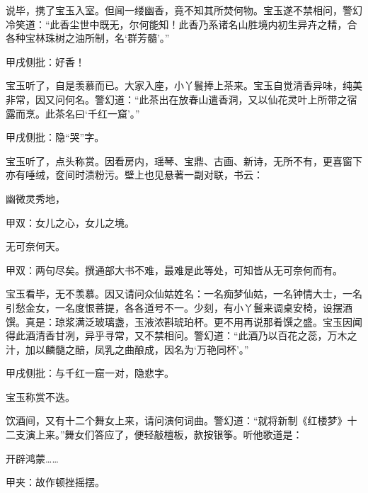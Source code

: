 \begin{parag}
    说毕，携了宝玉入室。但闻一缕幽香，竟不知其所焚何物。宝玉遂不禁相问，警幻冷笑道：“此香尘世中既无，尔何能知！此香乃系诸名山胜境内初生异卉之精，合各种宝林珠树之油所制，名‘群芳髓’。”\begin{note}甲戌侧批：好香！\end{note}宝玉听了，自是羡慕而已。大家入座，小丫鬟捧上茶来。宝玉自觉清香异味，纯美非常，因又问何名。警幻道：“此茶出在放春山遣香洞，又以仙花灵叶上所带之宿露而烹。此茶名曰‘千红一窟’。”\begin{note}甲戌侧批：隐“哭”字。\end{note}宝玉听了，点头称赏。因看房内，瑶琴、宝鼎、古画、新诗，无所不有，更喜窗下亦有唾绒，奁间时渍粉污。壁上也见悬著一副对联，书云：
\end{parag}


\begin{poem}
    \begin{pl}幽微灵秀地，\end{pl}\begin{note}甲双：女儿之心，女儿之境。\end{note}

    \begin{pl}无可奈何天。\end{pl}\begin{note}甲双：两句尽矣。撰通部大书不难，最难是此等处，可知皆从无可奈何而有。\end{note}
\end{poem}


\begin{parag}
    宝玉看毕，无不羡慕。因又请问众仙姑姓名：一名痴梦仙姑，一名钟情大士，一名引愁金女，一名度恨菩提，各各道号不一。少刻，有小丫鬟来调桌安椅，设摆酒馔。真是：琼浆满泛玻璃盏，玉液浓斟琥珀杯。更不用再说那肴馔之盛。宝玉因闻得此酒清香甘冽，异乎寻常，又不禁相问。警幻道：“此酒乃以百花之蕊，万木之汁，加以麟髓之醅，凤乳之曲酿成，因名为‘万艳同杯’。”\begin{note}甲戌侧批：与千红一窟一对，隐悲字。\end{note}宝玉称赏不迭。
\end{parag}


\begin{parag}
    饮酒间，又有十二个舞女上来，请问演何词曲。警幻道：“就将新制《红楼梦》十二支演上来。”舞女们答应了，便轻敲檀板，款按银筝。听他歌道是：
\end{parag}


\begin{qute}

    开辟鸿蒙……\begin{note}甲夹：故作顿挫摇摆。\end{note}
\end{qute}


